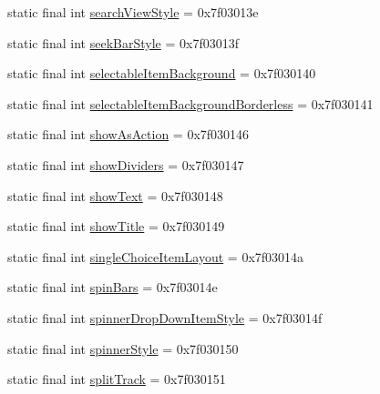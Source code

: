 \begin{DoxyCompactItemize}
\item 
static final int \mbox{\hyperlink{classandroid_1_1support_1_1v7_1_1appcompat_1_1_r_1_1attr_ab9b2ec7d0b89ab5a4ffe58337bcfcc12}{search\+View\+Style}} = 0x7f03013e
\item 
static final int \mbox{\hyperlink{classandroid_1_1support_1_1v7_1_1appcompat_1_1_r_1_1attr_aa8856badbf14c6de3caf2d725dfff02d}{seek\+Bar\+Style}} = 0x7f03013f
\item 
static final int \mbox{\hyperlink{classandroid_1_1support_1_1v7_1_1appcompat_1_1_r_1_1attr_a18a24684eaf9f44da2f89509089239bc}{selectable\+Item\+Background}} = 0x7f030140
\item 
static final int \mbox{\hyperlink{classandroid_1_1support_1_1v7_1_1appcompat_1_1_r_1_1attr_abdee90dc895f59172d94407f95904b04}{selectable\+Item\+Background\+Borderless}} = 0x7f030141
\item 
static final int \mbox{\hyperlink{classandroid_1_1support_1_1v7_1_1appcompat_1_1_r_1_1attr_a3c7edd0cae5923177e32940fd0dcd3e0}{show\+As\+Action}} = 0x7f030146
\item 
static final int \mbox{\hyperlink{classandroid_1_1support_1_1v7_1_1appcompat_1_1_r_1_1attr_ae948e5364369e00f603e38e8c34e8d14}{show\+Dividers}} = 0x7f030147
\item 
static final int \mbox{\hyperlink{classandroid_1_1support_1_1v7_1_1appcompat_1_1_r_1_1attr_a9ac2ca8ed5f729a16074381cc104cc54}{show\+Text}} = 0x7f030148
\item 
static final int \mbox{\hyperlink{classandroid_1_1support_1_1v7_1_1appcompat_1_1_r_1_1attr_a21abdb5220f4b4c5dc80beac684f0f63}{show\+Title}} = 0x7f030149
\item 
static final int \mbox{\hyperlink{classandroid_1_1support_1_1v7_1_1appcompat_1_1_r_1_1attr_ac19ccf7271deaa0914e545b5c7aa8f74}{single\+Choice\+Item\+Layout}} = 0x7f03014a
\item 
static final int \mbox{\hyperlink{classandroid_1_1support_1_1v7_1_1appcompat_1_1_r_1_1attr_a63effe2b027bf6d01b674c7dc0cbcce1}{spin\+Bars}} = 0x7f03014e
\item 
static final int \mbox{\hyperlink{classandroid_1_1support_1_1v7_1_1appcompat_1_1_r_1_1attr_ae53261907c675a6bc532a89886b0862a}{spinner\+Drop\+Down\+Item\+Style}} = 0x7f03014f
\item 
static final int \mbox{\hyperlink{classandroid_1_1support_1_1v7_1_1appcompat_1_1_r_1_1attr_a19f854eb7d94b49f27128ea04c2e56e8}{spinner\+Style}} = 0x7f030150
\item 
static final int \mbox{\hyperlink{classandroid_1_1support_1_1v7_1_1appcompat_1_1_r_1_1attr_a34c0e22820db21795eb653b9315b0349}{split\+Track}} = 0x7f030151

\end{DoxyCompactItemize}
